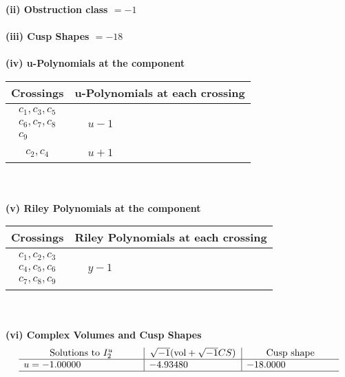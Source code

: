 \documentclass[1p]{elsarticle_modified}
\theoremstyle{definition}
\newcommand{\I}{\sqrt{-1}}
\begin{document}
\flushleft \textbf{(ii) Obstruction class $= -1$}\\~\\
\flushleft \textbf{(iii) Cusp Shapes $= -18$}\\~\\
\newpage\renewcommand{\arraystretch}{1}
\flushleft \textbf{(iv) u-Polynomials at the component}\newline \\
\begin{tabular}{m{50pt}|m{274pt}}
Crossings & \hspace{64pt}u-Polynomials at each crossing \\
\hline $$\begin{aligned}c_{1},c_{3},c_{5}\\c_{6},c_{7},c_{8}\\c_{9}\end{aligned}$$&$\begin{aligned}
&u-1
\end{aligned}$\\
\hline $$\begin{aligned}c_{2},c_{4}\end{aligned}$$&$\begin{aligned}
&u+1
\end{aligned}$\\
\hline
\end{tabular}\\~\\
\newpage\renewcommand{\arraystretch}{1}
\flushleft \textbf{(v) Riley Polynomials at the component}\newline \\
\begin{tabular}{m{50pt}|m{274pt}}
Crossings & \hspace{64pt}Riley Polynomials at each crossing \\
\hline $$\begin{aligned}c_{1},c_{2},c_{3}\\c_{4},c_{5},c_{6}\\c_{7},c_{8},c_{9}\end{aligned}$$&$\begin{aligned}
&y-1
\end{aligned}$\\
\hline
\end{tabular}\\~\\
\newpage\flushleft \textbf{(vi) Complex Volumes and Cusp Shapes}
$$\begin{array}{c|c|c}  
\text{Solutions to }I^u_{2}& \I (\text{vol} + \sqrt{-1}CS) & \text{Cusp shape}\\
 \hline 
\begin{aligned}
u &= -1.00000\phantom{ +0.000000I}\end{aligned}
 & -4.93480\phantom{ +0.000000I} & -18.0000\phantom{ +0.000000I}\\
 \hline 
 \end{array}$$\newpage
\end{document}
